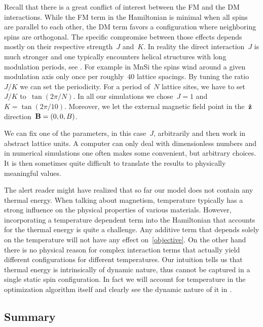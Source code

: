 Recall that there is a great conflict of interest between the FM and
the DM interactions. While the FM term in the Hamiltonian is minimal when all
spins are parallel to each other, the DM term favors a configuration where
neighboring spins are orthogonal. The specific compromise between those effects
depends mostly on their respective strength~$J$ and~$K$. In reality the direct
interaction~$J$ is much stronger and one typically encounters helical
structures with long modulation periods, see .  For example in MnSi the spins wind
around a given modulation axis only once per roughly~$40$ lattice spacings. By
tuning the ratio~$J/K$ we can set the periodicity. For a period of~$N$ lattice
sites, we have to set~$J/K$ to~$\tan(2\pi / N)$. In all our simulations we
chose~$J=1$ and~$K=\tan(2\pi / 10)$. Moreover, we let the external magnetic
field point in the~$\hat{\mathbf{z}}$ direction~$\mathbf{B}=(0,0,B)$.

We can fix one of the parameters, in this case~$J$, arbitrarily and then work in
abstract lattice units. A computer can only deal with dimensionless numbers and
in numerical simulations one often makes some convenient, but arbitrary choices.
It is then sometimes quite difficult to translate the results to physically
meaningful values.

The alert reader might have realized that so far our model does not contain any
thermal energy. When talking about magnetism, temperature typically has a strong
influence on the physical properties of various materials. However,
incorporating a temperature dependent term into the Hamiltonian that accounts
for the thermal energy is quite a challenge.  Any additive term that depends
solely on the temperature will not have any effect on~\eqref{objective}. On the
other hand there is no physical reason for complex interaction terms that
actually yield different configurations for different temperatures. Our
intuition tells us that thermal energy is intrinsically of dynamic nature, thus
cannot be captured in a single static spin configuration. In fact we will
account for temperature in the optimization algorithm itself and clearly see the
dynamic nature of it in .

\subsection{Summary}

